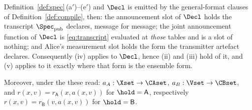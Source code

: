 \begin{theorem}
\begin{enumerate}[label=(\roman*),leftmargin=2.2em]
Definition~\ref{def:spec}\,(a$'$)--(e$'$) and $\Decl$ is emitted by the
general-format clauses of Definition~\ref{def:compile}, then: the
announcement slot of $\Decl$ holds the transcript $\Spec_{\mathrm{pub}}$
declares, message for message; the joint announcement function of $\Decl$ is
\eqref{eq:transcript} evaluated at \emph{those} tables and is a slot of
nothing; and Alice's measurement slot holds the form the transmitter artefact
declares. Consequently (iv) applies to $\Decl$, hence (ii) and (iii) hold of
it, and (v) applies to it exactly where that form is the ensemble form.
\end{enumerate}
Moreover, under the  these read:
$a_A:\Xset\to\CAset$, $a_B:\Vset\to\CBset$, and $r(x,v)=r_{\mathsf A}(x,a(x,v))$
for $\hold=\mathsf A$, respectively $r(x,v)=r_{\mathsf B}(v,a(x,v))$ for
$\hold=\mathsf B$.
\end{theorem}

